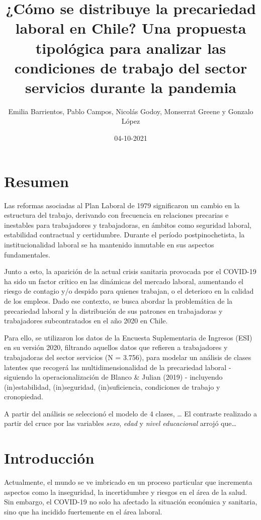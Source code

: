 \documentclass[
]{article}
\title{¿Cómo se distribuye la precariedad laboral en Chile? Una
propuesta tipológica para analizar las condiciones de trabajo del sector
servicios durante la pandemia}
\author{Emilia Barrientos, Pablo Campos, Nicolás Godoy, Monserrat Greene
y Gonzalo López}
\date{04-10-2021}
\begin{document}
\maketitle

{
\setcounter{tocdepth}{2}
\tableofcontents
}
\hypertarget{resumen}{%
\section{Resumen}\label{resumen}}

Las reformas asociadas al Plan Laboral de 1979 significaron un cambio en
la estructura del trabajo, derivando con frecuencia en relaciones
precarias e inestables para trabajadores y trabajadoras, en ámbitos como
seguridad laboral, estabilidad contractual y certidumbre. Durante el
período postpinochetista, la institucionalidad laboral se ha mantenido
inmutable en sus aspectos fundamentales.

Junto a esto, la aparición de la actual crisis sanitaria provocada por
el COVID-19 ha sido un factor crítico en las dinámicas del mercado
laboral, aumentando el riesgo de contagio y/o despido para quienes
trabajan, o el deterioro en la calidad de los empleos. Dado ese
contexto, se busca abordar la problemática de la precariedad laboral y
la distribución de sus patrones en trabajadoras y trabajadores
subcontratados en el año 2020 en Chile.

Para ello, se utilizaron los datos de la Encuesta Suplementaria de
Ingresos (ESI) en su versión 2020, filtrando aquellos datos que refieren
a trabajadores y trabajadoras del sector servicios (N = 3.756), para
modelar un análisis de clases latentes que recogerá las
multidimensionalidad de la precariedad laboral - siguiendo la
operacionalización de Blanco \& Julian (2019) - incluyendo
(in)estabilidad, (in)seguridad, (in)suficiencia, condiciones de trabajo
y cronopiedad.

A partir del análisis se seleccionó el modelo de 4 clases, \ldots{} El
contraste realizado a partir del cruce por las variables \emph{sexo},
\emph{edad} y \emph{nivel educacional} arrojó que\ldots{}

\hypertarget{introducciuxf3n}{%
\section{Introducción}\label{introducciuxf3n}}

Actualmente, el mundo se ve imbricado en un proceso particular que
incrementa aspectos como la inseguridad, la incertidumbre y riesgos en
el área de la salud. Sin embargo, el COVID-19 no solo ha afectado la
situación económica y sanitaria, sino que ha incidido fuertemente en el
área laboral.
\end{document}
